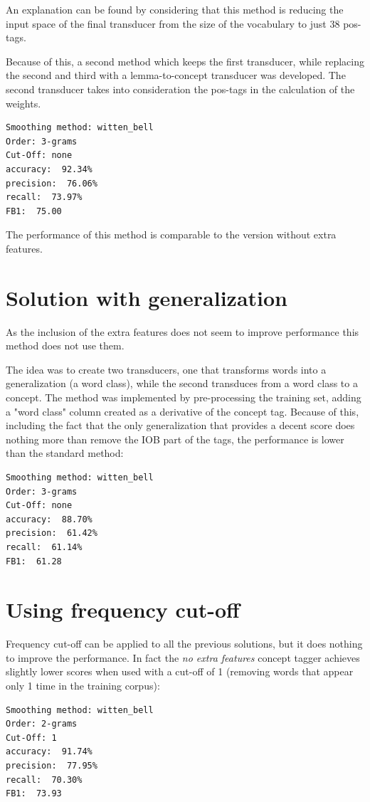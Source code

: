 \documentclass[11pt,a4paper]{article}
\begin{document}
An explanation can be found by considering that this method is reducing the input space of the final transducer from the size of the vocabulary to just 38 pos-tags.

Because of this, a second method which keeps the first transducer, while replacing the second and third with a lemma-to-concept transducer was developed.
The second transducer takes into consideration the pos-tags in the calculation of the weights.

\begin{verbatim}
Smoothing method: witten_bell
Order: 3-grams
Cut-Off: none
accuracy:  92.34%
precision:  76.06%
recall:  73.97%
FB1:  75.00
\end{verbatim}

The performance of this method is comparable to the version without extra features.


\section{Solution with generalization}
As the inclusion of the extra features does not seem to improve performance this method does not use them.

The idea was to create two transducers, one that transforms words into a generalization (a word class), while the second transduces from a word class to a concept. The method was implemented by pre-processing the training set, adding a "word class" column created as a derivative of the concept tag. Because of this, including the fact that the only generalization that provides a decent score does nothing more than remove the IOB part of the tags, the performance is lower than the standard method:
\begin{verbatim}
Smoothing method: witten_bell
Order: 3-grams
Cut-Off: none
accuracy:  88.70%
precision:  61.42%
recall:  61.14%
FB1:  61.28
\end{verbatim}

\section{Using frequency cut-off}

Frequency cut-off can be applied to all the previous solutions, but it does nothing to improve the performance.
In fact the \textit{no extra features} concept tagger achieves slightly lower scores when used with a cut-off of 1 (removing words that appear only 1 time in the training corpus):
\begin{verbatim}
Smoothing method: witten_bell
Order: 2-grams
Cut-Off: 1
accuracy:  91.74%
precision:  77.95%
recall:  70.30%
FB1:  73.93
\end{verbatim}
\end{document}
